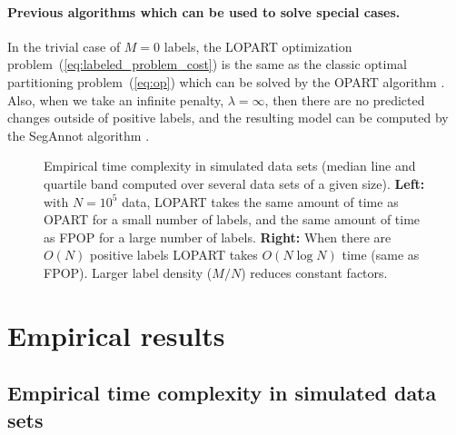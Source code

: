 \documentclass[12pt]{article}
\begin{document}
\paragraph{Previous algorithms which can be used to solve special cases.} In the trivial case of $M=0$ labels, the LOPART optimization problem~(\ref{eq:labeled_problem_cost}) is the same as the classic optimal partitioning problem~(\ref{eq:op}) which can be solved by the OPART algorithm \citep{Jackson2005}.
Also, when we take an infinite penalty, $\lambda=\infty$, then there are no predicted changes outside of positive labels, and the resulting model can be computed by the SegAnnot algorithm \citep{Hocking2014}.


\begin{figure}
  
    
    \vskip -0.5cm
    \caption{Empirical time complexity in simulated data sets (median line and quartile band computed over several data sets of a given size). 
    \textbf{Left:} with $N=10^5$ data, LOPART takes the same amount of time as OPART for a small number of labels, and the same amount of time as FPOP for a large number of labels.
    \textbf{Right:} When there are $O(N)$ positive labels LOPART takes $O(N\log N)$ time (same as FPOP). Larger label density ($M/N$) reduces constant factors.
    }
    \label{fig:timings}
\end{figure}

%     


\section{Empirical results}

\subsection{Empirical time complexity in simulated data sets}
\end{document}
